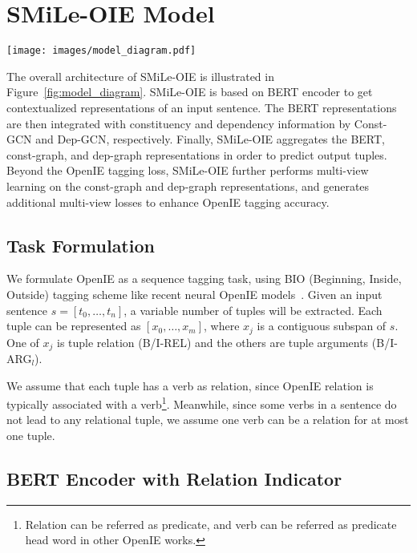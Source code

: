 \documentclass[11pt]{article}
\newcommand{\mname}{SMiLe-OIE\xspace}
\begin{document}
\section{\mname Model}\label{sec:model}
\setlength{\abovedisplayskip}{3pt}
\setlength{\belowdisplayskip}{3pt}

\begin{figure*}
   \centering
   \texttt{[image: images/model\_diagram.pdf]}
\caption{Overview of \mname model architecture.}
   \label{fig:model_diagram}
\end{figure*}


The overall architecture of \mname is illustrated in Figure~\ref{fig:model_diagram}. \mname is based on BERT encoder to get contextualized representations of an input sentence. The BERT representations are then integrated with constituency and dependency information by Const-GCN and Dep-GCN, respectively. Finally, \mname aggregates the BERT, const-graph, and dep-graph representations in order to predict output tuples. Beyond the OpenIE tagging loss, \mname  further performs multi-view learning on the const-graph and dep-graph representations, and generates additional multi-view losses to enhance OpenIE tagging accuracy.


\subsection{Task Formulation}


We formulate OpenIE as a sequence tagging task, using BIO (Beginning, Inside, Outside) tagging scheme like recent neural OpenIE models~\cite{stanovsky2018supervised}.
Given an input sentence $s=[t_0, \dots, t_n]$, a variable number of tuples will be extracted. Each tuple can be represented as $[x_0, \dots, x_m]$, where $x_j$ is a contiguous subspan of $s$.
One of $x_j$ is tuple relation (B/I-REL) and the others are tuple arguments (B/I-ARG$_l$).

We assume that each tuple has a verb as relation, since OpenIE relation is typically associated with a verb\footnote{Relation can be referred as predicate, and verb can be referred as predicate head word in other OpenIE works.}. Meanwhile, since some verbs in a sentence do not lead to any relational tuple, we assume one verb can be a relation for at most one tuple.



\subsection{BERT Encoder with Relation Indicator}\label{subsec:bert_encoder}
\end{document}
